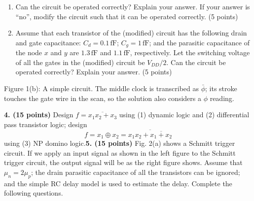 \documentclass[10pt]{article}
\newcommand{\mos}[4]{\begin{scope}[shift={(#1,#2)}]
\draw (0,.24)--(0,-.24);\draw (0,.20)--(.25,.20)--(.25,.5);
\draw (0,-.20)--(.25,-.20)--(.25,-.5);\draw (-.16,.23)--(-.16,-.23);
\ifnum#4=1\draw (-.26,0) circle (.06);\draw (-.75,0)--(-.32,0);\else\draw (-.75,0)--(-.16,0);\fi
\node[anchor=east,font=\scriptsize] at (-.76,0) {$#3$};\end{scope}}
\newcommand{\ground}[2]{\draw (#1,#2)--(#1,{#2-.12});\draw ({#1-.17},{#2-.12})--({#1+.17},{#2-.12});\draw ({#1-.11},{#2-.20})--({#1+.11},{#2-.20});}
\newcommand{\rail}[3]{\draw (#1,#2)--(#1,{#2+.14});\node[above,font=\scriptsize] at (#1,{#2+.14}) {$#3$};}
\begin{document}
\begin{enumerate}[label=(\alph*),leftmargin=7mm,itemsep=3pt]
\item Can the circuit be operated correctly? Explain your answer. If your answer is ``no'', modify the circuit such that it can be operated correctly. (5 points)
\item Assume that each transistor of the (modified) circuit has the following drain and gate capacitance: $C_d=0.1\,\mathrm{fF}$; $C_g=1\,\mathrm{fF}$; and the parasitic capacitance of the node $x$ and $y$ are $1.3\,\mathrm{fF}$ and $1.1\,\mathrm{fF}$, respectively. Let the switching voltage of all the gates in the (modified) circuit be $V_{DD}/2$. Can the circuit be operated correctly? Explain your answer. (5 points)
\end{enumerate}\begin{center}\end{center}
\begin{center}\small Figure 1(b): A simple circuit. The middle clock is transcribed as $\bar\phi$; its stroke touches the gate wire in the scan, so the solution also considers a $\phi$ reading.\end{center}\textbf{4. (15 points)} Design $f=\overline{x_1x_2+x_3}$ using (1) dynamic logic and (2) differential pass transistor logic; design
\[
f=x_1\oplus x_2=\overline{x_1x_2+\overline{x_1+x_2}}
\]
using (3) NP domino logic.\newpage\textbf{5. (15 points)} Fig. 2(a) shows a Schmitt trigger circuit. If we apply an input signal as shown in the left figure to the Schmitt trigger circuit, the output signal will be as the right figure shows. Assume that $\mu_n=2\mu_p$; the drain parasitic capacitance of all the transistors can be ignored; and the simple RC delay model is used to estimate the delay. Complete the following questions.
\end{document}
